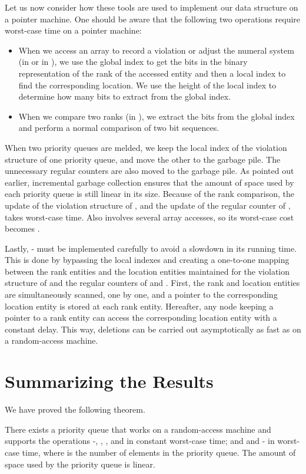 \documentclass{llncs}
\newcommand{\Findmin}{\mbox{\mbox{\rm -}}}
\newcommand{\Insert}{\mbox{}}
\newcommand{\Deletemin}{\mbox{\mbox{\rm -}}}
\newcommand{\Decrease}{\mbox{}}
\newcommand{\Delete}{\mbox{}}
\newcommand{\Meld}{\mbox{}}
\begin{document}
Let us now consider how these tools are used to implement our data
structure on a pointer machine.  One should be aware that the
following two operations require  worst-case time on a pointer machine: 
\begin{itemize}
\item When we access an array to record a violation or adjust the
  numeral system (in \Decrease{} or in \Meld{}), we use the global
  index to get the bits in the binary representation of the rank of
  the accessed entity and then a local index to find the corresponding
  location. We use the height of the local index to determine how many
  bits to extract from the global index. 
\item When we compare two ranks (in \Meld{}), we extract the bits from
  the global index and perform a normal comparison of two bit sequences. 
\end{itemize}
When two priority queues are melded, we keep the local index of the 
violation structure of one priority queue, and move the other to the garbage pile. 
The unnecessary regular counters are also moved to the garbage pile. As pointed out earlier,
incremental garbage collection ensures that the amount of space used
by each priority queue is still linear in its size.  Because of the rank
comparison, the update of the violation structure of , and the
update of the regular counter of , \Meld{} takes  worst-case
time. Also \Decrease{} involves several array accesses, so its
worst-case cost becomes .

Lastly, \Deletemin{} must be implemented carefully to avoid a slowdown
in its running time. This is done by bypassing the local indexes and
creating a one-to-one mapping between the rank entities and the
location entities maintained for the violation structure of  and
the regular counters of  and .  First, the rank and location
entities are simultaneously scanned, one by one, and a pointer to the
corresponding location entity is stored at each rank entity.
Hereafter, any node keeping a pointer to a rank entity can access the
corresponding location entity with a constant delay.  This way,
deletions can be carried out asymptotically as fast as on a
random-access machine.


\section{Summarizing the Results}

We have proved the following theorem.

\begin{theorem}
There exists a priority queue that works on a random-access machine
and supports the operations \Findmin{},
\Insert{}, \Decrease{}, and \Meld{} in constant worst-case time; and
\Delete{} and \Deletemin{} in  worst-case time, where  is
the number of elements in the priority queue.  The amount of space used by the
priority queue is linear.
\end{theorem}
\end{document}
